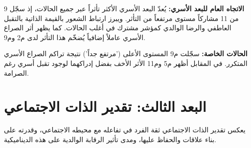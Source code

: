 \documentclass[12pt,oneside]{report}
\begin{document}
\noindent\textbf{الاتجاه العام للبعد الأسري:} يُعدّ البعد الأسري الأكثر تأثراً عبر جميع الحالات، إذ سجّل 9 من 11 مشاركاً مستوى مرتفعاً من التأثر. ويبرز ارتباط الشعور بالقيمة الذاتية بالتقبل العاطفي والرضا الوالدي كمؤشر مشترك في أغلب الحالات. كما يظهر أثر الصراع الأسري عاملاً إضافياً يُضخّم هذا التأثر لدى م2 وم9.\par
\noindent\textbf{الحالات الخاصة:} سجّلت م9 المستوى الأعلى ('مرتفع جداً') نتيجة تراكم الصراع الأسري المتكرر. في المقابل أظهر م5 وم11 الأثر الأخف بفضل إدراكهما لوجود تقبل أسري رغم الصرامة.\par
\section{البعد الثالث: تقدير الذات الاجتماعي}
يعكس تقدير الذات الاجتماعي ثقة الفرد في تفاعله مع محيطه الاجتماعي، وقدرته على بناء علاقات والحفاظ عليها، ومدى تأثير الرقابة الوالدية على هذه الديناميكية.
\end{document}
